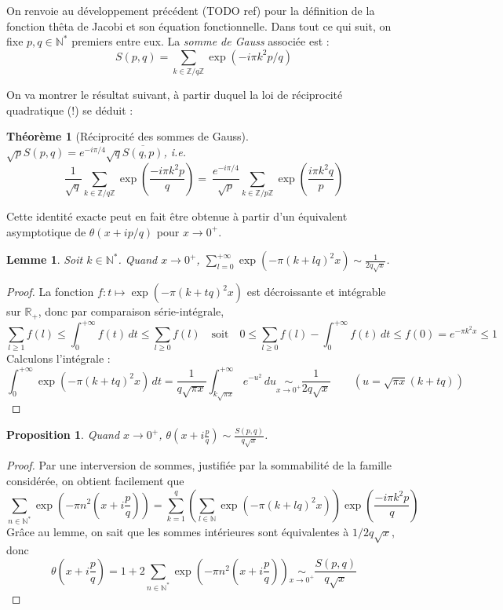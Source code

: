 \documentclass[a4paper, 11pt]{article}
\def\Z{\mathbb{Z}}
\def\N{\mathbb{N}}
\def\R{\mathbb{R}}
\newtheorem*{proposition}{Proposition}
\newtheorem*{theorem}{Théorème}
\newtheorem*{lemma}{Lemme}
\begin{document}
On renvoie au développement précédent (TODO ref) pour la définition de la
fonction thêta de Jacobi et son équation fonctionnelle.
Dans tout ce qui suit, on fixe $p, q \in \N^*$ premiers entre eux. La
\emph{somme de Gauss} associée est :
\[S(p,q) = \sum_{k \in \Z/q\Z} \exp(-i\pi k^2 p/q) \]

On va montrer le résultat suivant, à partir duquel la loi de réciprocité
quadratique (!) se déduit :

\begin{theorem}[Réciprocité des sommes de Gauss]
  $\sqrt{p}S(p,q) = e^{-i\pi/4}\sqrt{q}\overline{S(q,p)}$, i.e.
  \[ \frac{1}{\sqrt{q}} \sum_{k \in \Z/q\Z}
    \exp\left(\frac{-i\pi k^2 p}{q}\right) =
    \ \frac{e^{-i\pi/4}}{\sqrt{p}} \sum_{k \in \Z/p\Z}
    \exp\left(\frac{i\pi k^2 q}{p}\right) \]
\end{theorem}

Cette identité exacte peut en fait être obtenue à partir d'un équivalent
asymptotique de $\theta(x + ip/q)$ pour $x \to 0^+$.

\begin{lemma} Soit $k \in \N^*$. Quand $x \to 0^+$,
  $\displaystyle \sum_{l = 0}^{+\infty} \exp(-\pi(k+lq)^2x)
  \sim \frac{1}{2q\sqrt{x}}$.
\end{lemma}

\begin{proof}
  La fonction $f : t \mapsto \exp(-\pi(k+tq)^2x)$ est décroissante et intégrable
  sur $\R_+$, donc par comparaison série-intégrale,
 \[ \sum_{l \geq 1} f(l) \leq \int_0^{+\infty} f(t)\,dt \leq
   \sum_{l \geq 0} f(l) \quad \text{soit} \quad
   0 \leq \sum_{l \geq 0} f(l) - \int_0^{+\infty} f(t)\,dt \leq f(0) =
   e^{-\pi k^2 x} \leq 1
 \]
 Calculons l'intégrale :
 \[ \int_0^{+\infty} \exp(-\pi(k+tq)^2x)\,dt =
   \frac{1}{q\sqrt{\pi x}} \int_{k\sqrt{\pi x}}^{+\infty} e^{-u^2}\,du
    \underset{x \to 0^+}{\sim} \frac{1}{2q\sqrt{x}}
   \qquad
  (u = \sqrt{\pi x}(k + tq))
\]
\end{proof}

\begin{proposition}
  Quand $x \to 0^+$,
  $\displaystyle \theta\left( x + i\frac{p}{q} \right)
  \sim \frac{S(p,q)}{q\sqrt{x}}$.
\end{proposition}

\begin{proof}
  Par une interversion de sommes, justifiée par la sommabilité
  de la famille considérée, on obtient facilement que
  \[ \sum_{n \in \N^*} \exp\left(-\pi n^2 \left( x + i\frac{p}{q}  \right)\right)
    = \sum_{k = 1}^q \left( \sum_{l \in \N} \exp(-\pi(k+lq)^2x) \right)
    \exp\left(\frac{-i\pi k^2 p}{q} \right)
  \]
  Grâce au lemme, on sait que les sommes intérieures sont équivalentes à
  $1/2q\sqrt{x}$, donc
\[ \theta\left( x + i\frac{p}{q} \right) = 1 + 2 \sum_{n \in \N^*}
  \exp\left(-\pi n^2 \left( x + i\frac{p}{q} \right)\right)
      \underset{x \to 0^+}{\sim} \frac{S(p,q)}{q\sqrt{x}}
\]
\end{proof}
\end{document}
